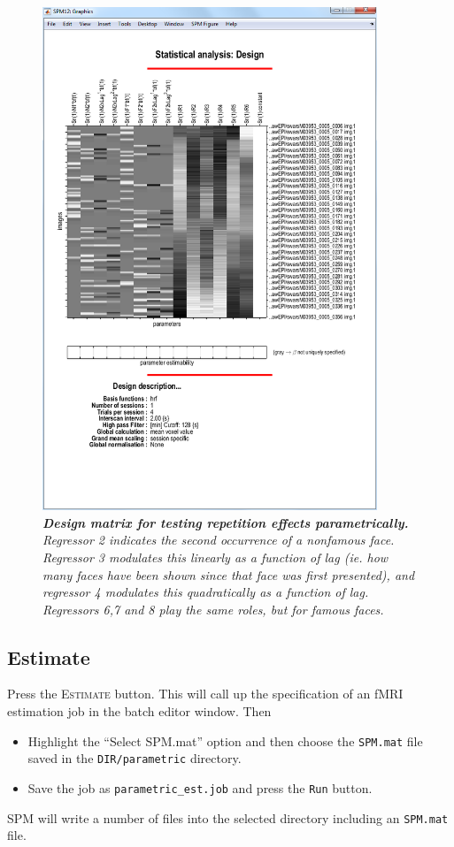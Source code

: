 \begin{figure}
\begin{center}
\includegraphics[width=100mm]{faces/par_design}
\caption{\em \textbf{Design matrix for testing repetition effects parametrically.} Regressor 2 indicates the second occurrence of a nonfamous face. Regressor 3 modulates this linearly as a function of lag (ie. how many faces have been shown since that face was first presented), and regressor 4 modulates this quadratically as a function of lag. Regressors 6,7 and 8 play the same roles, but for famous faces. \label{par_design} }
\end{center}
\end{figure}

\subsection{Estimate}

Press the \textsc{Estimate} button. This will call up the specification of an fMRI estimation job in the batch editor window. Then
\begin{itemize}
\item Highlight the ``Select SPM.mat'' option and then choose the \texttt{SPM.mat} file saved in the \texttt{DIR/parametric} directory.
\item Save the job as \texttt{parametric\_est.job} and press the \texttt{Run} button.
\end{itemize}
SPM will write a number of files into the selected directory including an \texttt{SPM.mat} file.

